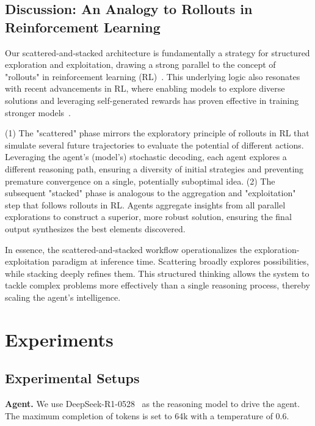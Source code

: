 \documentclass{article}
\begin{document}
\subsection{Discussion: An Analogy to Rollouts in Reinforcement Learning}

Our scattered-and-stacked architecture is fundamentally a strategy for structured exploration and exploitation, drawing a strong parallel to the concept of "rollouts" in reinforcement learning (RL)~\citep{tesauro1995temporal,sutton1998reinforcement,auer2002finite,guo2025deepseek}.
This underlying logic also resonates with recent advancements in RL, where enabling models to explore diverse solutions and leveraging self-generated rewards has proven effective in training stronger models~\citep{zhao2025absolute,zhao2025learning,prabhudesai2025maximizing}.

(1) The "scattered" phase mirrors the exploratory principle of rollouts in RL that simulate several future trajectories to evaluate the potential of different actions.
Leveraging the agent's (model's) stochastic decoding, each agent explores a different reasoning path, ensuring a diversity of initial strategies and preventing premature convergence on a single, potentially suboptimal idea.
(2) The subsequent "stacked" phase is analogous to the aggregation and "exploitation" step that follows rollouts in RL.
Agents aggregate insights from all parallel explorations to construct a superior, more robust solution, ensuring the final output synthesizes the best elements discovered.

In essence, the scattered-and-stacked workflow operationalizes the exploration-exploitation paradigm at inference time. 
Scattering broadly explores possibilities, while stacking deeply refines them.
This structured thinking allows the system to tackle complex problems more effectively than a single reasoning process, thereby scaling the agent's intelligence.

\section{Experiments}
\subsection{Experimental Setups}
\textbf{Agent.}
We use DeepSeek-R1-0528~\citep{deepseek-r1-0528} as the reasoning model to drive the agent.
The maximum completion of tokens is set to 64k with a temperature of 0.6.
\end{document}
